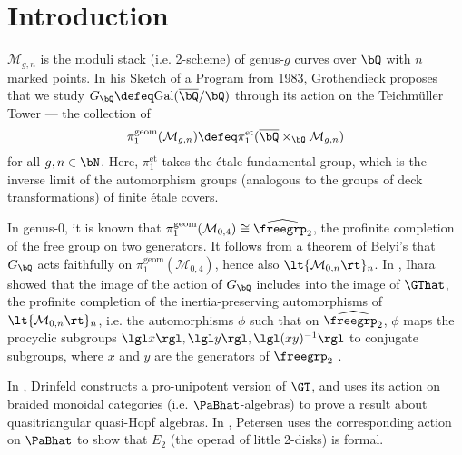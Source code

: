 \chapter{Introduction}
$\mathcal{M}_{g,n}$ is the moduli stack (i.e. 2-scheme) of genus-$g$ curves over $\bQ$ with $n$ marked points. In his Sketch of a Program \cite{Grothendieck_1997} from 1983, Grothendieck proposes that we study $G_\bQ\defeq\mathrm{Gal}(\overline\bQ/\bQ)$ through its action on the Teichm\"uller Tower --- the collection of
\[\pi^{\mathrm{geom}}_1(\mathcal{M}_{g,n})\defeq\pi_1^{\mathrm{et}}(\overline{\bQ}\times_{\bQ}\mathcal{M}_{g,n})\]
for all $g,n\in\bN$. Here, $\pi_1^{\mathrm{et}}$ takes the \'etale fundamental group, which is the inverse limit of the automorphism groups (analogous to the groups of deck transformations) of finite \'etale covers.

In genus-0, it is known that $\pi^{\mathrm{geom}}_1(\mathcal{M}_{0,4})\cong\widehat{\freegrp_2}$, the profinite completion of the free group on two generators. It follows from a theorem of Belyi's \cite{Belyi_1980} that $G_\bQ$ acts faithfully on $\pi^{\mathrm{geom}}_1(\mathcal{M}_{0,4})$, hence also $\lt\{\mathcal{M}_{0,n}\rt\}_n$. In \cite{Ihara_1991}, Ihara showed that the image of the action of $G_\bQ$ includes into the image of $\GThat$, the profinite completion of the inertia-preserving automorphisms of $\lt\{\mathcal{M}_{0,n}\rt\}_n$, i.e. the automorphisms $\phi$ such that on $\widehat{\freegrp_2}$, $\phi$ maps the procyclic subgroups $\lgl x\rgl,\lgl y\rgl,\lgl(xy)^{-1}\rgl$ to conjugate subgroups, where $x$ and $y$ are the generators of $\freegrp_2$ \cite{Lochak}.

In \cite{Drinfeld_1991}, Drinfeld constructs a pro-unipotent
version of $\GT$, and uses its action on braided monoidal categories (i.e. $\PaBhat$-algebras) to prove a result about quasitriangular quasi-Hopf algebras.
In \cite{Petersen_2014}, Petersen uses the corresponding action on $\PaBhat$ to show that $E_2$ (the operad of little 2-disks) is formal.